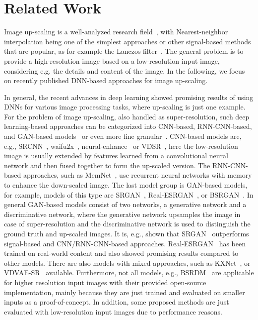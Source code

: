 \section{Related Work}
\label{sec:soa}
Image up-scaling is a well-analyzed research field~\cite{singh2020survey,van2006image}, with Nearest-neighbor interpolation being one of the simplest approaches or other signal-based methods that are popular, as for example the Lanczos filter~\cite{duchon1979lanczos}.
The general problem is to provide a high-resolution image based on a low-resolution input image, considering e.g. the details and content of the image.
In the following, we focus on recently published DNN-based approaches for image up-scaling.

In general, the recent advances in deep learning showed promising results of using DNNs for various image processing tasks, where up-scaling is just one example.
For the problem of image up-scaling, also handled as super-resolution, such deep learning-based approaches can be categorized into CNN-based, RNN-CNN-based, and GAN-based models~\cite{ha2018deep} or even more fine granular~\cite{anwar2020deep}.
CNN-based models are, e.g., SRCNN~\cite{dong2014learning}, waifu2x~\cite{waifu2x}, neural-enhance~\cite{shi2016real} or VDSR~\cite{kim2016accurate}, here the low-resolution image is usually extended by features learned from a convolutional neural network and then fused together to form the up-scaled version.
The RNN-CNN-based approaches, such as MemNet~\cite{tai2017memnet}, use recurrent neural networks with memory to enhance the down-scaled image.
The last model group is GAN-based models, for example, models of this type are SRGAN~\cite{ledig2017photo}, Real-ESRGAN~\cite{wang2021realesrgan}, or BSRGAN~\cite{zhang2021designing}.
In general GAN-based models consist of two networks, a generative network and a discriminative network, where the generative network upsamples the image in case of super-resolution and the discriminative network is used to distinguish the ground truth and up-scaled images.
It is, e.g., shown that SRGAN~\cite{ledig2017photo} outperforms signal-based and CNN/RNN-CNN-based approaches.
Real-ESRGAN~\cite{wang2021realesrgan} has been trained on real-world content and also showed promising results compared to other models.
There are also models with mixed approaches, such as KXNet~\cite{fu2022kxnet}, or VDVAE-SR~\cite{chira2023image} available.
Furthermore, not all models, e.g., BSRDM~\cite{yue2022blind} are applicable for higher resolution input images with their provided open-source implementation, mainly because they are just trained and evaluated on smaller inputs as a proof-of-concept.
In addition, some proposed methods are just evaluated with low-resolution input images due to performance reasons.

